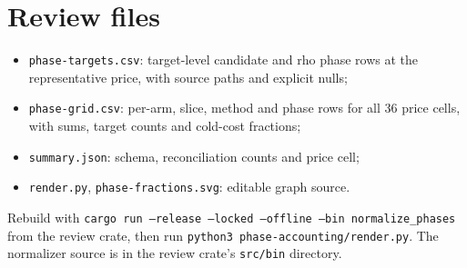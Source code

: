 \documentclass[11pt]{article}
\begin{document}
\section*{Review files}
\begin{itemize}
\item \texttt{phase-targets.csv}: target-level candidate and rho phase rows at
the representative price, with source paths and explicit nulls;
\item \texttt{phase-grid.csv}: per-arm, slice, method and phase rows for all
36 price cells, with sums, target counts and cold-cost fractions;
\item \texttt{summary.json}: schema, reconciliation counts and price cell;
\item \texttt{render.py}, \texttt{phase-fractions.svg}: editable graph source.
\end{itemize}
Rebuild with \texttt{cargo run --release --locked --offline --bin normalize\_phases}
from the review crate, then run \texttt{python3 phase-accounting/render.py}.
The normalizer source is in the review crate's \texttt{src/bin} directory.
\end{document}
